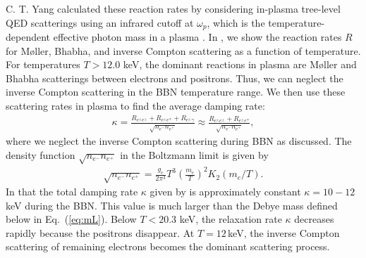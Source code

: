 C. T. Yang calculated these reaction rates by considering in-plasma tree-level QED scatterings using an infrared cutoff at $\omega_p$, which is the temperature-dependent effective photon mass in a plasma \cite{Yang:2024ret}.
In , we show the reaction rates $R$ for M{\o}ller, Bhabha, and inverse Compton scattering as a function of temperature. For temperatures $T>12.0$ keV, the dominant reactions in plasma are M{\o}ller and Bhabha scatterings between electrons and positrons. Thus, we can neglect the inverse Compton scattering in the BBN temperature range.
We then use these scattering rates in plasma to find the average damping rate:
\begin{align}\label{Eq:Kappa}
\kappa=\frac{R_{e^\pm e^\pm}+R_{e^\pm e^\mp}+R_{e^\pm\gamma}}{\sqrt{n_{e^-}n_{e^+}}}\approx\frac{R_{e^\pm e^\pm}+R_{e^\pm e^\mp}}{\sqrt{n_{e^-}n_{e^+}}},
\end{align}
where we neglect the inverse Compton scattering during BBN as discussed. The density function ${\sqrt{n_{e^-}n_{e^+}}}$ in the Boltzmann limit is given by
\begin{align}
{\sqrt{n_{e^-}n_{e^+}}}=\frac{g_e}{2\pi^3}T^3\left(\frac{m_e}{T}\right)^2K_2(m_e/T).
\end{align}
In  that the total damping rate $\kappa$ given by    is approximately constant $\kappa=10-12$ keV during the BBN. This value is much larger than the Debye mass defined below in Eq.~(\ref{eq:mL}). Below $T<20.3$ keV, the relaxation rate $\kappa$ decreases rapidly because the positrons disappear. At $T=12$\,keV, the inverse Compton scattering of remaining electrons becomes the dominant scattering process. 

